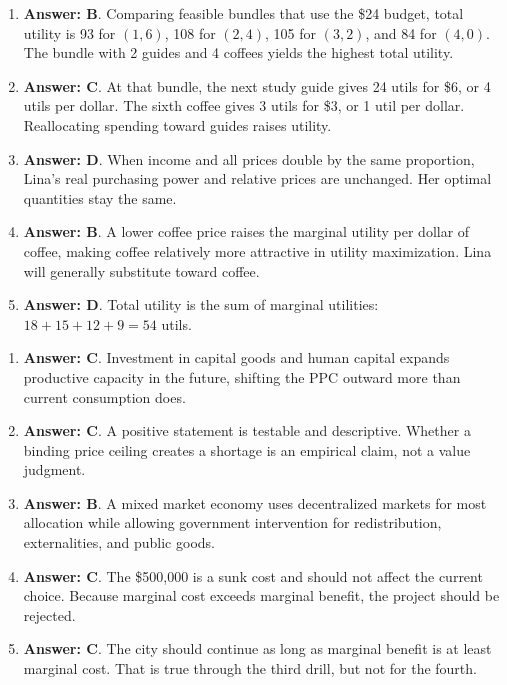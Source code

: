 \documentclass[10pt]{article}
\begin{document}
\begin{enumerate}[resume*=aps, leftmargin=*, itemsep=0.6em, topsep=0.2em, parsep=0pt]
\item \textbf{Answer: B}. Comparing feasible bundles that use the \$24 budget, total utility is 93 for $(1,6)$, 108 for $(2,4)$, 105 for $(3,2)$, and 84 for $(4,0)$. The bundle with 2 guides and 4 coffees yields the highest total utility.
\item \textbf{Answer: C}. At that bundle, the next study guide gives 24 utils for \$6, or 4 utils per dollar. The sixth coffee gives 3 utils for \$3, or 1 util per dollar. Reallocating spending toward guides raises utility.
\item \textbf{Answer: D}. When income and all prices double by the same proportion, Lina's real purchasing power and relative prices are unchanged. Her optimal quantities stay the same.
\item \textbf{Answer: B}. A lower coffee price raises the marginal utility per dollar of coffee, making coffee relatively more attractive in utility maximization. Lina will generally substitute toward coffee.
\item \textbf{Answer: D}. Total utility is the sum of marginal utilities: $18+15+12+9=54$ utils.
\end{enumerate}
\begin{enumerate}[resume*=aps, leftmargin=*, itemsep=0.6em, topsep=0.2em, parsep=0pt]
\item \textbf{Answer: C}. Investment in capital goods and human capital expands productive capacity in the future, shifting the PPC outward more than current consumption does.
\item \textbf{Answer: C}. A positive statement is testable and descriptive. Whether a binding price ceiling creates a shortage is an empirical claim, not a value judgment.
\item \textbf{Answer: B}. A mixed market economy uses decentralized markets for most allocation while allowing government intervention for redistribution, externalities, and public goods.
\item \textbf{Answer: C}. The \$500{,}000 is a sunk cost and should not affect the current choice. Because marginal cost exceeds marginal benefit, the project should be rejected.
\item \textbf{Answer: C}. The city should continue as long as marginal benefit is at least marginal cost. That is true through the third drill, but not for the fourth.
\end{enumerate}
\end{document}
